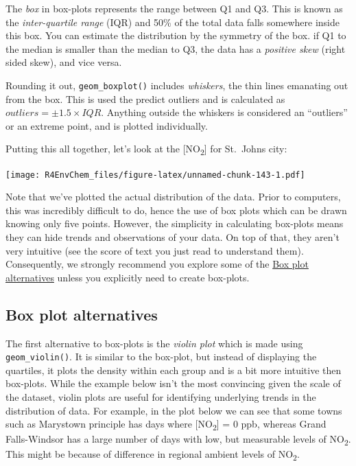 \documentclass[
]{book}
\begin{document}
The \emph{box} in box-plots represents the range between Q1 and Q3. This is known as the \emph{inter-quartile range} (IQR) and 50\% of the total data falls somewhere inside this box. You can estimate the distribution by the symmetry of the box. if Q1 to the median is smaller than the median to Q3, the data has a \emph{positive skew} (right sided skew), and vice versa.

Rounding it out, \texttt{geom\_boxplot()} includes \emph{whiskers}, the thin lines emanating out from the box. This is used the predict outliers and is calculated as \(outliers = \pm 1.5 \times IQR\). Anything outside the whiskers is considered an ``outliers'' or an extreme point, and is plotted individually.

Putting this all together, let's look at the {[}NO\textsubscript{2}{]} for St.~Johns city:

\texttt{[image: R4EnvChem\_files/figure-latex/unnamed-chunk-143-1.pdf]}

Note that we've plotted the actual distribution of the data. Prior to computers, this was incredibly difficult to do, hence the use of box plots which can be drawn knowing only five points. However, the simplicity in calculating box-plots means they can hide trends and observations of your data. On top of that, they aren't very intuitive (see the score of text you just read to understand them). Consequently, we strongly recommend you explore some of the \protect\hyperlink{box-plot-alternatives}{Box plot alternatives} unless you explicitly need to create box-plots.

\hypertarget{box-plot-alternatives}{%
\subsection{Box plot alternatives}\label{box-plot-alternatives}}

The first alternative to box-plots is the \emph{violin plot} which is made using \texttt{geom\_violin()}. It is similar to the box-plot, but instead of displaying the quartiles, it plots the density within each group and is a bit more intuitive then box-plots. While the example below isn't the most convincing given the scale of the dataset, violin plots are useful for identifying underlying trends in the distribution of data. For example, in the plot below we can see that some towns such as Marystown principle has days where {[}NO\textsubscript{2}{]} = 0 ppb, whereas Grand Falls-Windsor has a large number of days with low, but measurable levels of NO\textsubscript{2}. This might be because of difference in regional ambient levels of NO\textsubscript{2}.
\end{document}
